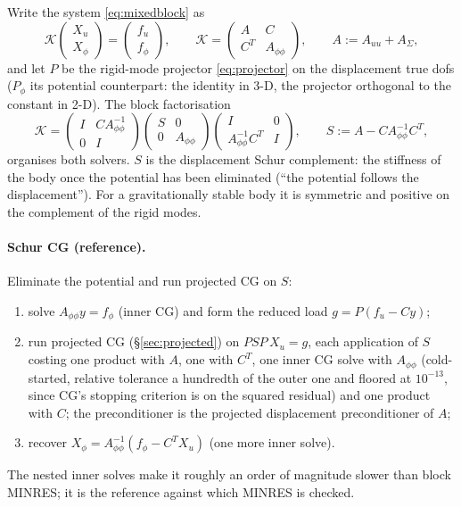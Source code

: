 \documentclass[11pt]{article}
\numberwithin{equation}{section}
\theoremstyle{remark}
\begin{document}
Write the system \eqref{eq:mixedblock} as
\begin{equation}
  \mathcal{K}\begin{pmatrix}X_u\\X_\phi\end{pmatrix}
  = \begin{pmatrix}f_u\\f_\phi\end{pmatrix}, \qquad
  \mathcal{K} = \begin{pmatrix} A & C\\ C^T & A_{\phi\phi}\end{pmatrix},
  \qquad A := A_{uu} + A_\Sigma ,
\end{equation}
and let $P$ be the rigid-mode projector \eqref{eq:projector} on the
displacement true dofs ($P_\phi$ its potential counterpart: the identity in
3-D, the projector orthogonal to the constant in 2-D). The block
factorisation
\begin{equation}
  \mathcal{K} = \begin{pmatrix} I & CA_{\phi\phi}^{-1}\\ 0 & I\end{pmatrix}
  \begin{pmatrix} S & 0\\ 0 & A_{\phi\phi}\end{pmatrix}
  \begin{pmatrix} I & 0\\ A_{\phi\phi}^{-1}C^T & I\end{pmatrix},
  \qquad S := A - CA_{\phi\phi}^{-1}C^T ,
  \label{eq:schurfact}
\end{equation}
organises both solvers. $S$ is the displacement Schur complement: the
stiffness of the body once the potential has been eliminated (``the
potential follows the displacement''). For a gravitationally stable body it
is symmetric and positive on the complement of the rigid modes.

\paragraph{Schur CG (reference).} Eliminate the potential and run projected
CG on $S$:
\begin{enumerate}
\item solve $A_{\phi\phi}y = f_\phi$ (inner CG) and form the reduced load
  $g = P(f_u - Cy)$;
\item run projected CG (\S\ref{sec:projected}) on $PSP\,X_u = g$, each
  application of $S$ costing one product with $A$, one with $C^T$, one inner
  CG solve with $A_{\phi\phi}$ (cold-started, relative tolerance a hundredth
  of the outer one and floored at $10^{-13}$, since CG's stopping criterion
  is on the squared residual) and one product with $C$; the preconditioner
  is the projected displacement preconditioner of $A$;
\item recover $X_\phi = A_{\phi\phi}^{-1}(f_\phi - C^TX_u)$ (one more inner
  solve).
\end{enumerate}
The nested inner solves make it roughly an order of magnitude slower than
block MINRES; it is the reference
against which MINRES is checked.
\end{document}
